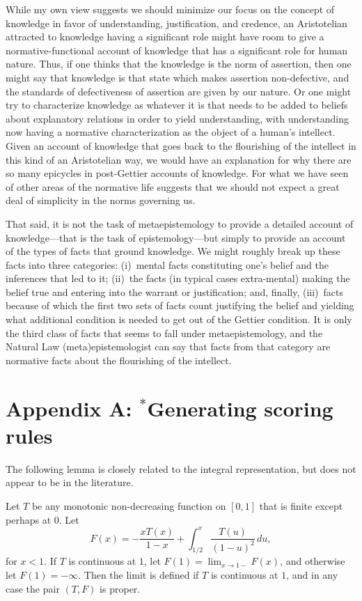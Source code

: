 While my own view suggests we should minimize our focus on the concept of knowledge in favor of understanding, justification, and credence, 
an Aristotelian attracted to knowledge having a significant role might have room to give a normative-functional account of knowledge that
has a significant role for human nature. Thus, if one thinks that the knowledge is the norm of assertion, then one might say that
knowledge is that state which makes assertion non-defective, and the standards of defectiveness of assertion are given by our nature.
Or one might try to characterize knowledge as whatever it is that needs to be added to beliefs about explanatory relations in order to yield
understanding, with understanding now having a normative characterization as the object of a human's intellect.
Given an account of knowledge that goes back to the flourishing of the intellect in this kind of an Aristotelian way, we would have
an explanation for why there are so many epicycles in post-Gettier accounts of knowledge. For what we have seen of other areas of the
normative life suggests that we should not expect a great deal of simplicity in the norms governing us. 

That said, it is not the task of metaepistemology to provide a detailed account of knowledge---that is the task of epistemology---but simply
to provide an account of the types of facts that ground knowledge. We might roughly break up these facts into three categories:
(i)~mental facts constituting one's belief and the inferences that led to it; (ii)~the facts (in typical cases extra-mental) making the 
belief true and entering into the warrant or justification; and, finally, (iii)~facts because of which the first two sets of
facts count justifying the belief and yielding what additional condition is needed to get out of the Gettier condition. It is only
the third class of facts that seems to fall under metaepistemology, and the Natural Law (meta)epistemologist
can say that facts from that category are normative 
facts about the flourishing of the intellect. 

\section{Appendix A: $^*$Generating scoring rules}
The following lemma is closely related to the  integral representation, but does not
appear to be in the literature.

\begin{lem}\label{lem:T2F}
Let $T$ be any monotonic non-decreasing function on $[0,1]$ that is finite except perhaps at $0$. 
Let
$$
	F(x) = -\frac{xT(x)}{1-x}+\int_{1/2}^x \frac{T(u)}{(1-u)^2} \, du,
$$
for $x<1$. If $T$ is continuous at $1$, let $F(1)=\lim_{x\to 1-} F(x)$, and otherwise
let $F(1)=-\infty$. Then the limit is defined if $T$ is continuous at $1$, and in any case the pair $(T,F)$ is proper.
\end{lem}

